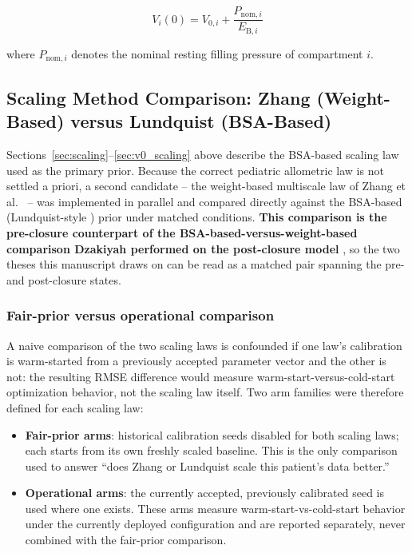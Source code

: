 \documentclass{article}
\begin{document}
\begin{equation}
    V_i(0) = V_{0,i} + \frac{P_{\mathrm{nom},i}}{E_{\mathrm{B},i}}
    \label{eq:ic_cardiac}
\end{equation}

\noindent where $P_{\mathrm{nom},i}$ denotes the nominal resting filling pressure of compartment $i$.

\subsection{Scaling Method Comparison: Zhang (Weight-Based) versus Lundquist (BSA-Based)}
\label{sec:scaling_comparison}

Sections~\ref{sec:scaling}--\ref{sec:v0_scaling} above describe the BSA-based scaling law used as the primary prior. Because the correct pediatric allometric law is not settled a priori, a second candidate -- the weight-based multiscale law of Zhang et al.\ \cite{zhang2019multiscale} -- was implemented in parallel and compared directly against the BSA-based (Lundquist-style \cite{Lundquist2025}) prior under matched conditions. \textbf{This comparison is the pre-closure counterpart of the BSA-based-versus-weight-based comparison Dzakiyah performed on the post-closure model} \cite{Dzakiyah2026Thesis}, so the two theses this manuscript draws on can be read as a matched pair spanning the pre- and post-closure states.

\subsubsection{Fair-prior versus operational comparison}

A naive comparison of the two scaling laws is confounded if one law's calibration is warm-started from a previously accepted parameter vector and the other is not: the resulting RMSE difference would measure warm-start-versus-cold-start optimization behavior, not the scaling law itself. Two arm families were therefore defined for each scaling law:
\begin{itemize}[leftmargin=1.5em]
    \item \textbf{Fair-prior arms}: historical calibration seeds disabled for both scaling laws; each starts from its own freshly scaled baseline. This is the only comparison used to answer ``does Zhang or Lundquist scale this patient's data better.''
    \item \textbf{Operational arms}: the currently accepted, previously calibrated seed is used where one exists. These arms measure warm-start-vs-cold-start behavior under the currently deployed configuration and are reported separately, never combined with the fair-prior comparison.
\end{itemize}
\end{document}
